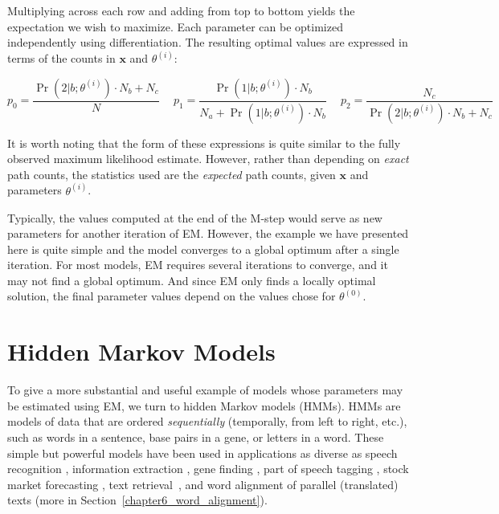 \noindent Multiplying across each row and adding from top to bottom
yields the expectation we wish to maximize.  Each parameter can be
optimized independently using differentiation.  The resulting optimal
values are expressed in terms of the counts in $\textbf{x}$ and
$\theta^{(i)}$:

\begin{equation}
p_0 = \frac{\Pr(2|b;\theta^{(i)}) \cdot N_b + N_c}{N} \quad\  p_1 = \frac{\Pr(1|b;\theta^{(i)}) \cdot N_b}{N_a + \Pr(1|b;\theta^{(i)}) \cdot N_b} \quad\   p_2 = \frac{N_c}{\Pr(2|b;\theta^{(i)}) \cdot N_b + N_c}
\end{equation}

\noindent It is worth noting that the form of these expressions is
quite similar to the fully observed maximum likelihood estimate.
However, rather than depending on \emph{exact} path counts, the
statistics used are the \emph{expected} path counts, given
$\textbf{x}$ and parameters $\theta^{(i)}$.

Typically, the values computed at the end of the M-step would serve as
new parameters for another iteration of EM.  However, the example we
have presented here is quite simple and the model converges to a
global optimum after a single iteration.  For most models, EM requires
several iterations to converge, and it may not find a global optimum.
And since EM only finds a locally optimal solution, the final
parameter values depend on the values chose for $\theta^{(0)}$.

\section{Hidden Markov Models}
\label{chapter6_hmms}

To give a more substantial and useful example of models whose
parameters may be estimated using EM, we turn to hidden Markov models
(HMMs).  HMMs are models of data that are ordered \emph{sequentially}
(temporally, from left to right, etc.), such as words in a sentence,
base pairs in a gene, or letters in a word.  These simple but powerful
models have been used in applications as diverse as speech recognition
\cite{Jelinek_1997}, information extraction \cite{Seymore_1999}, gene
finding \cite{Stanke_2003}, part of speech tagging
\cite{Cutting_1992}, stock market forecasting \cite{Hassan_2005}, text
retrieval~\cite{MillerD99}, and word alignment of parallel
(translated) texts \cite{Vogel_1996} (more in
Section~\ref{chapter6_word_alignment}).

